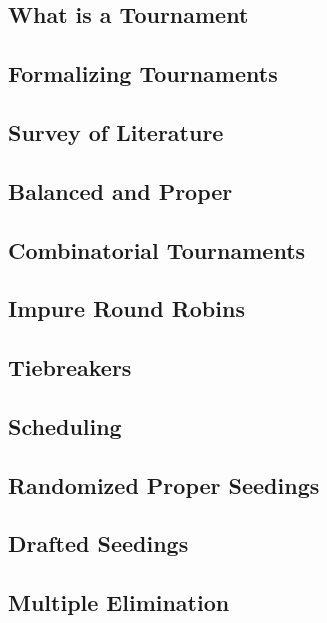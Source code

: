\documentclass[12pt, leqno]{article}
\begin{document}
    \tableofcontents

        \subsection {What is a Tournament} %
        \subsection {Formalizing Tournaments}
        \subsection {Survey of Literature}
        \subsection {Balanced and Proper}


        \subsection {Combinatorial Tournaments}
        \subsection {Impure Round Robins} %
        \subsection {Tiebreakers}
        \subsection {Scheduling}

        \subsection{Randomized Proper Seedings}
        \subsection{Drafted Seedings}
        \subsection{Multiple Elimination} 
\end{document}

